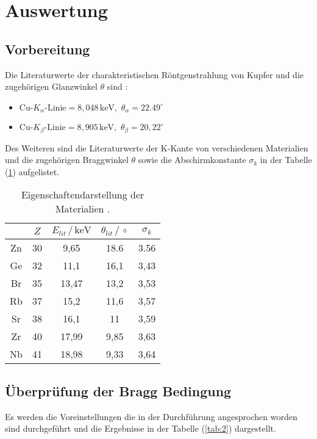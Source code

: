 \section{Auswertung}
\subsection{Vorbereitung}
Die Literaturwerte der charakteristischen Röntgenstrahlung von Kupfer und die zugehörigen
Glanzwinkel $\theta$ sind \cite{2}:
\begin{itemize}
  \item $\text{Cu-}K_\alpha \text{-Linie} = 8,048 \,\text{keV} , \, \, \theta_\alpha = 22.49^\circ$
  \item $\text{Cu-}K_\beta \text{-Linie} = 8,905 \,\text{keV} , \, \, \theta_\beta = 20,22^\circ$

\end{itemize}

Des Weiteren sind die Literaturwerte der K-Kante von verschiedenen Materialien und die zugehörigen
Braggwinkel $\theta$ sowie die Abschirmkonstante $\sigma_k$ in der Tabelle (\ref{tab:1}) aufgelistet.
\begin{table}
  \centering
  \caption{Eigenschaftendarstellung der Materialien \cite{3}.}
  \label{tab:1}
  \begin{tabular}{c c c c c}
    \toprule
     & $Z$ & $E_{lit}\,/ \, \text{keV}$ &$\theta_{lit}\,/\,\circ$ & $\sigma_k$ \\
    \midrule
    Zn & 30 & 9,65  &  18.6 & 3.56 \\
    Ge & 32 & 11,1  &  16,1 & 3,43 \\
    Br & 35 & 13,47 &  13,2 & 3,53 \\
    Rb & 37 & 15,2  &  11,6 & 3,57 \\
    Sr & 38 & 16,1  &  11   & 3,59 \\
    Zr & 40 & 17,99 &  9,85 & 3,63 \\
    Nb & 41 & 18,98 &  9,33 & 3,64 \\
    \bottomrule
  \end{tabular}
\end{table}

\subsection{Überprüfung der Bragg Bedingung}
Es werden die Voreinstellungen die in der Durchführung angesprochen worden sind
durchgeführt und die Ergebnisse in der Tabelle (\ref{tab:2})
dargestellt.

